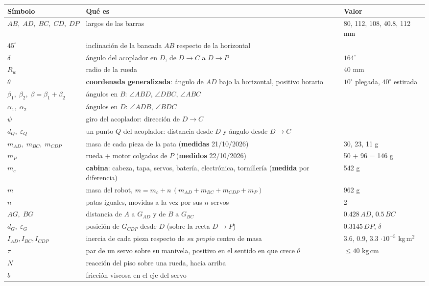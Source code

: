 \documentclass[11pt,a4paper]{article}
\begin{document}
\begin{center}\small\setlength{\tabcolsep}{4pt}
\begin{tabular}{l p{7.9cm} l}
\toprule
Símbolo & Qué es & Valor \\
\midrule
\(AB,\;AD,\;BC,\;CD,\;DP\) & largos de las barras & 80, 112, 108, 40.8, 112 mm \\
\(45^\circ\) & inclinación de la bancada \(AB\) respecto de la horizontal & \\
\(\delta\) & ángulo del acoplador en \(D\), de \(D\!\to\!C\) a \(D\!\to\!P\) & \(164^\circ\) \\
\(R_w\) & radio de la rueda & 40 mm \\
\(\theta\) & \textbf{coordenada generalizada}: ángulo de \(AD\) bajo la horizontal, positivo horario & \(10^\circ\) plegada, \(40^\circ\) estirada \\
\(\beta_1,\;\beta_2,\;\beta=\beta_1+\beta_2\) & ángulos en \(B\): \(\angle ABD\), \(\angle DBC\), \(\angle ABC\) & \\
\(\alpha_1,\;\alpha_2\) & ángulos en \(D\): \(\angle ADB\), \(\angle BDC\) & \\
\(\psi\) & giro del acoplador: dirección de \(D\!\to\!C\) & \\
\(d_Q,\;\varepsilon_Q\) & un punto \(Q\) del acoplador: distancia desde \(D\) y ángulo desde \(D\!\to\!C\) & \\
\(m_{AD},\;m_{BC},\;m_{CDP}\) & masa de cada pieza de la pata (\textbf{medidas} 21/10/2026) & 30, 23, 11 g \\
\(m_P\) & rueda + motor colgados de \(P\) (\textbf{medidos} 22/10/2026) & 50 + 96 = 146 g \\
\(m_c\) & \textbf{cabina}: cabeza, tapa, servos, batería, electrónica, tornillería (\textbf{medida} por diferencia) & 542 g \\
\(m\) & masa del robot, \(m=m_c+n\,(m_{AD}+m_{BC}+m_{CDP}+m_P)\) & 962 g \\
\(n\) & patas iguales, movidas a la vez por sus \(n\) servos & 2 \\
\(AG,\;BG\) & distancia de \(A\) a \(G_{AD}\) y de \(B\) a \(G_{BC}\) & \(0.428\,AD\), \(0.5\,BC\) \\
\(d_G,\;\varepsilon_G\) & posición de \(G_{CDP}\) desde \(D\) (sobre la recta \(D\!\to\!P\)) & \(0.3145\,DP\), \(\delta\) \\
\(I_{AD},I_{BC},I_{CDP}\) & inercia de cada pieza respecto de \emph{su propio} centro de masa & 3.6, 0.9, 3.3 \(\cdot10^{-5}\) kg\,m\(^2\) \\
\(\tau\) & par de un servo sobre su manivela, positivo en el sentido en que crece \(\theta\) & \(\le 40\) kg\,cm \\
\(N\) & reacción del piso sobre una rueda, hacia arriba & \\
\(b\) & fricción viscosa en el eje del servo & \\
\bottomrule
\end{tabular}
\end{center}
\end{document}

